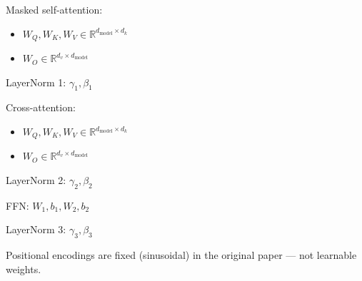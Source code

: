 Masked self-attention:
\begin{itemize}
  \item $W_Q, W_K, W_V \in \mathbb{R}^{d_{\text{model}} \times d_k}$
  \item $W_O \in \mathbb{R}^{d_v \times d_{\text{model}}}$
\end{itemize}

LayerNorm 1: $\gamma_1, \beta_1$

Cross-attention:
\begin{itemize}
  \item $W_Q, W_K, W_V \in \mathbb{R}^{d_{\text{model}} \times d_k}$
  \item $W_O \in \mathbb{R}^{d_v \times d_{\text{model}}}$
\end{itemize}

LayerNorm 2: $\gamma_2, \beta_2$

FFN: $W_1, b_1, W_2, b_2$

LayerNorm 3: $\gamma_3, \beta_3$

\medskip

Positional encodings are fixed (sinusoidal) in the original paper --- not learnable weights.